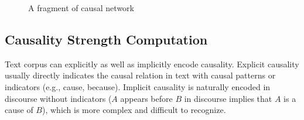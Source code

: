 %

\begin{figure}[th]
\centering
{}
\caption{A fragment of causal network}
\label{fig:causalnet}
\end{figure}

%

%
\subsection{Causality Strength Computation}
\label{sec:causalstrength}


Text corpus can explicitly as well as implicitly encode causality.
Explicit causality usually directly indicates the causal relation in text
with causal patterns or indicators (e.g., cause, because).
Implicit causality is naturally encoded in discourse without indicators ($A$
appears before $B$ in discourse implies that $A$ is a cause of $B$), which is 
more complex and difficult to recognize.


